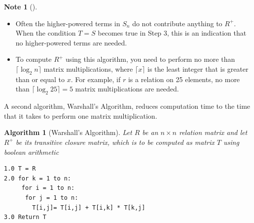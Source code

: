 \documentclass[10pt,]{book}
\theoremstyle{plain}
\newtheorem{algorithm}[theorem]{Algorithm}
\theoremstyle{definition}
\theoremstyle{definition}
\newtheorem{note}[theorem]{Note}
\theoremstyle{definition}
\theoremstyle{definition}
\begin{document}
\begin{note}[]\label{note-1}
\leavevmode%
\begin{itemize}[label=\textbullet]
\item{} Often the higher-powered terms in \(S_n\) do not contribute anything to \(R^+\). When the condition \(T = S\) becomes true in Step 3, this is an indication that no higher-powered terms are needed.%
\item{} To compute \(R^+\) using this algorithm, you need to perform no more than \(\lceil \log_2 n \rceil\) matrix multiplications, where
\(\lceil x \rceil\) is the least integer that is greater than or equal to \(x\). For example, if \(r\) is a relation on 25 elements,
no more than \(\lceil \log_2 25 \rceil = 5\) matrix multiplications are needed.%
\end{itemize}
%
\end{note}
\par
A second algorithm, Warshall's Algorithm, reduces computation time to the time that it takes to perform one matrix multiplication.%
\begin{algorithm}[Warshall's Algorithm]\label{alg-warshall}
Let \(R\) be an \(n \times n\) relation matrix and let \(R^+\) be its transitive closure matrix, which is to be computed as matrix \(T\) using boolean arithmetic%
\begin{lstlisting}[style=genericinput]
1.0 T = R
2.0 for k = 1 to n:
     for i = 1 to n:
      for j = 1 to n:
        T[i,j]= T[i,j] + T[i,k] * T[k,j]
3.0 Return T
\end{lstlisting}
\end{algorithm}
\typeout{************************************************}
\typeout{************************************************}
\end{document}
